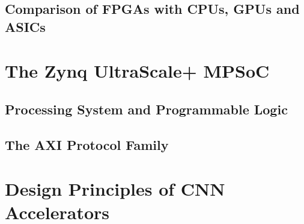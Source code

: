\subsection{Comparison of FPGAs with CPUs, GPUs and ASICs}
\label{sec:fpga-vs}

\section{The Zynq UltraScale+ MPSoC}
\label{sec:zynq}

\subsection{Processing System and Programmable Logic}
\label{sec:ps-pl}

\subsection{The AXI Protocol Family}
\label{sec:axi}

\section{Design Principles of CNN Accelerators}
\label{sec:accel-principles}

